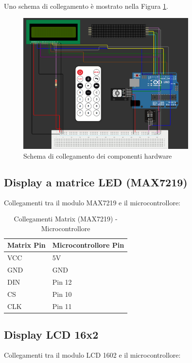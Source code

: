 \documentclass[a4paper, 12pt]{article}
\begin{document}
Uno schema di collegamento è mostrato nella Figura \ref{fig:setup-hardware-diagram}.
\begin{figure}[H]
	\centering
	\includegraphics[width=0.8\textwidth]{media/collegamenti.png}
	\caption{Schema di collegamento dei componenti hardware}
	\label{fig:setup-hardware-diagram}
\end{figure}

\subsection{Display a matrice LED (MAX7219)}
\label{subsec:setup-max7219}
Collegamenti tra il modulo MAX7219 e il microcontrollore:

\begin{table}[H]
	\centering
	\caption{Collegamenti Matrix (MAX7219) - Microcontrollore}
	\label{tab:matrix-max7219-connections}
	\begin{tabular}{ll}
		\toprule
		\textbf{Matrix Pin} & \textbf{Microcontrollore Pin} \\
		\midrule
		VCC                 & 5V                            \\
		GND                 & GND                           \\
		DIN                 & Pin 12                        \\
		CS                  & Pin 10                        \\
		CLK                 & Pin 11                        \\
		\bottomrule
	\end{tabular}
\end{table}

\subsection{Display LCD 16x2}
\label{subsec:setup-lcd}
Collegamenti tra il modulo LCD 1602 e il microcontrollore:
\end{document}
